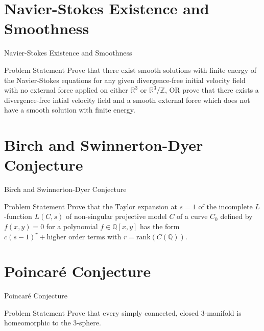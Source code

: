 \documentclass{beamer}
\newcommand{\Poincare}{Poincar\'{e}}
\newcommand{\Real}{\mathbb{R}}
\newcommand{\Rational}{\mathbb{Q}}
\newcommand{\Integer}{\mathbb{Z}}
\begin{document}
  \section{Navier-Stokes Existence and Smoothness}
  \begin{frame}{Navier-Stokes Existence and Smoothness}
      \begin{block}{Problem Statement}
          Prove that there exist smooth solutions with finite energy of the
          Navier-Stokes equations for any given divergence-free initial
          velocity field with no external force applied on either $\Real^3$
          or $\Real^3/\Integer$, OR prove that there exists a divergence-free
          intial velocity field and a smooth external force which does not
          have a smooth solution with finite energy.
      \end{block}
  \end{frame}

  \section{Birch and Swinnerton-Dyer Conjecture}
  \begin{frame}{Birch and Swinnerton-Dyer Conjecture}
      \begin{block}{Problem Statement}
          Prove that the Taylor expansion at $s=1$ of the incomplete
          $L$-function $L(C, s)$ of non-singular projective model $C$ of a
          curve $C_0$ defined by $f(x, y) = 0$ for a polynomial
          $f \in \Rational [x, y]$ has the form
          $c(s-1)^r + \text{higher order terms}$ with
          $r = \mathrm{rank}(C(\Rational))$.
      \end{block}
  \end{frame}

  \section{\Poincare{} Conjecture}
  \begin{frame}{\Poincare{} Conjecture}
      \begin{block}{Problem Statement}
          Prove that every simply connected, closed 3-manifold is
          homeomorphic to the 3-sphere.
      \end{block}
  \end{frame}
\end{document}
